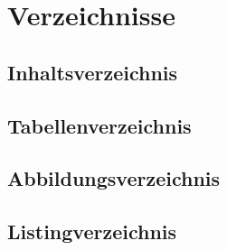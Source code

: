 \section{Verzeichnisse}
\subsection{Inhaltsverzeichnis}
\subsection{Tabellenverzeichnis}
\subsection{Abbildungsverzeichnis}
\subsection{Listingverzeichnis}